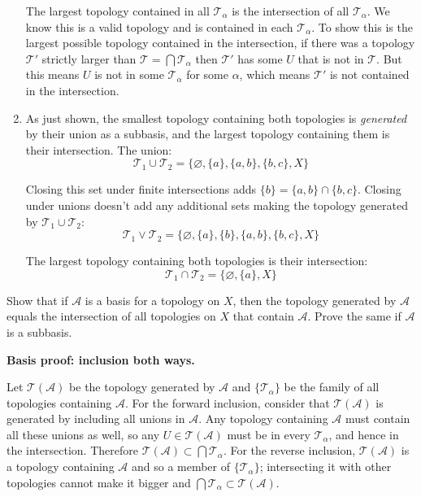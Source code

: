 \documentclass{article}
\begin{document}
\begin{enumerate}[label=\alph*)]
        The largest topology contained in all $\mathscr{T}_\alpha$ is the intersection of all $\mathscr{T}_\alpha$. We know this is a valid topology and is contained in each $\mathscr{T}_\alpha$. To show this is the largest possible topology contained in the intersection, if there was a topology $\mathscr{T}'$ strictly larger than $\mathscr{T} = \bigcap \mathscr{T}_\alpha$ then $\mathscr{T}'$ has some $U$ that is not in $\mathscr{T}$. But this means $U$ is not in some $\mathscr{T}_\alpha$ for some $\alpha$, which means $\mathscr{T}'$ is not contained in the intersection.

  \item As just shown, the smallest topology containing both topologies is \textit{generated} by their union as a subbasis, and the largest topology containing them is their intersection. The union:
        $$\mathscr{T}_1 \cup \mathscr{T}_2 = \{\varnothing, \{a\}, \{a, b\}, \{b, c\}, X\}$$

        Closing this set under finite intersections adds $\{b\} = \{a, b\} \cap \{b, c\}$. Closing under unions doesn't add any additional sets making the topology generated by $\mathscr{T}_1 \cup \mathscr{T}_2$:
        $$\mathscr{T}_1 \vee \mathscr{T}_2 = \{\varnothing, \{a\}, \{b\}, \{a, b\}, \{b, c\}, X\}$$

        The largest topology containing both topologies is their intersection:
        $$\mathscr{T}_1 \cap \mathscr{T}_2 = \{\varnothing, \{a\}, X\}$$
\end{enumerate}

\begin{problem}
Show that if $\mathscr{A}$ is a basis for a topology on $X$, then the topology generated by $\mathscr{A}$ equals the intersection of all topologies on $X$ that contain $\mathscr{A}$. Prove the same if $\mathscr{A}$ is a subbasis.
\end{problem}

\textbf{Basis proof: inclusion both ways.}

Let $\mathscr{T}(\mathscr{A})$ be the topology generated by $\mathscr{A}$ and $\{\mathscr{T}_\alpha\}$ be the family of all topologies containing $\mathscr{A}$. For the forward inclusion, consider that $\mathscr{T}(\mathscr{A})$ is generated by including all unions in $\mathscr{A}$. Any topology containing $\mathscr{A}$ must contain all these unions as well, so any $U \in \mathscr{T}(\mathscr{A})$ must be in every $\mathscr{T}_\alpha$, and hence in the intersection. Therefore $\mathscr{T}(\mathscr{A}) \subset \bigcap \mathscr{T}_\alpha$. For the reverse inclusion, $\mathscr{T}(\mathscr{A})$ is a topology containing $\mathscr{A}$ and so a member of $\{\mathscr{T}_\alpha\}$; intersecting it with other topologies cannot make it bigger and $\bigcap \mathscr{T}_\alpha \subset \mathscr{T}(\mathscr{A})$.
\end{document}

